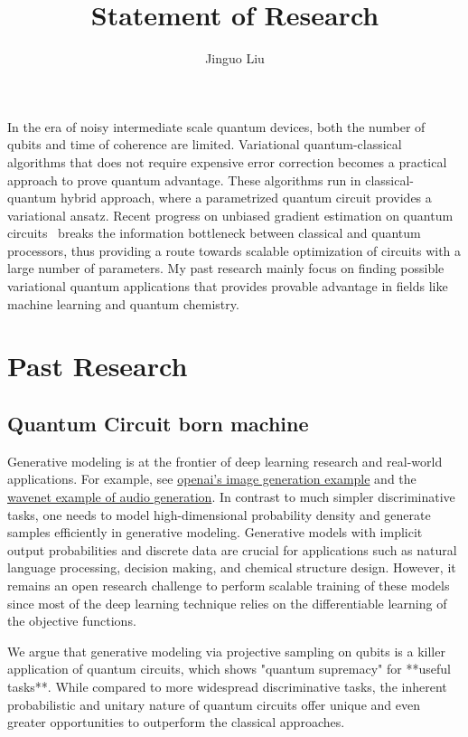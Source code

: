 \documentclass[]{article}
\date{}
\title{Statement of Research}
\author{Jinguo Liu}
\begin{document}
\maketitle

In the era of noisy intermediate scale quantum devices, both the number of qubits and time of coherence are limited. Variational quantum-classical algorithms that does not require expensive error correction becomes a practical approach to prove quantum advantage. These algorithms run in classical-quantum hybrid approach, where a parametrized quantum circuit provides a variational ansatz. Recent progress on unbiased gradient estimation on quantum circuits~\cite{Li2017a, Mitarai2018, Liu2018, Verdon2018, Schuld2018, Javier2018, Bergholm2018, Guerreschi2017,Farhi2018,Romero2018,Harrow2019,Dallaire2018} breaks the information bottleneck between classical and quantum processors, thus providing a route towards scalable optimization of circuits with a large number of parameters.
My past research mainly focus on finding possible variational quantum applications that provides provable advantage in fields like machine learning and quantum chemistry.

\section{Past Research}
\subsection{Quantum Circuit born machine}
Generative modeling is at the frontier of deep learning research and real-world applications. For example, see \href{https://blog.openai.com/generative-models/}{openai's image generation example} and the \href{https://deepmind.com/blog/wavenet-generative-model-raw-audio/}{wavenet example of audio generation}. In contrast to much simpler discriminative tasks, one needs to model high-dimensional probability density and generate samples efficiently in generative modeling. Generative models with implicit output probabilities and discrete data are crucial for applications such as natural language processing, decision making, and chemical structure design. However, it remains an open research challenge to perform scalable training of these models since most of the deep learning technique relies on the differentiable learning of the objective functions. 

We argue that generative modeling via projective sampling on qubits is a killer application of quantum circuits, which shows "quantum supremacy" for **useful tasks**. While compared to more widespread discriminative tasks, the inherent probabilistic and unitary nature of quantum circuits offer unique and even greater opportunities to outperform the classical approaches. 
\end{document}
